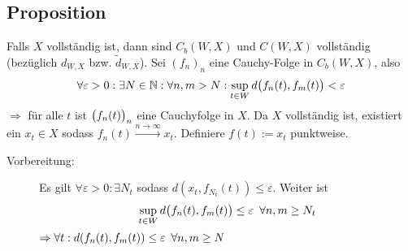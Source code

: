 \subsection[Proposition: $X$ vollständig $\Rightarrow$ $C-B(W,X)$ und $C8W,X$ vollständig]{Proposition} %
\label{sub:18}
Falls $X$ vollständig ist, dann sind $C_b(W,X)$ und $C(W,X)$ vollständig (bezüglich $d_{W,X}$ bzw. $\tilde{d}_{W,X}$).
Sei $(f_n)_n$ eine Cauchy-Folge in $C_b(W,X)$, also
\[
	\forall \varepsilon>0 : \exists N \in \mathds{N} : \forall n,m >N : \sup_{t \in W} d \enbrace[\big]{f_n(t), f_m(t)}< \varepsilon 
\]
$\Rightarrow$ für alle $t$ ist $\enbrace[\big]{f_n(t)}_n$ eine Cauchyfolge in $X$. Da $X$ vollständig ist, existiert ein $x_t \in X$ sodass 
$f_n(t) \xrightarrow{n \to \infty} x_t$. Definiere $f(t) := x_t$ punktweise.
\begin{description}
	\item[Vorbereitung:] Es gilt $\forall \varepsilon>0 : \exists N_t$ sodass $d(x_t, f_{N_t}(t)) \le \varepsilon$. Weiter ist
	\[
		\sup_{t \in W} d \enbrace[\big]{f_n(t), f_m(t)}\le \varepsilon \enspace \forall n,m \ge N_t
	\]
	$\Rightarrow \forall t : d \enbrace*{f_n(t), f_m(t)}\le \varepsilon \enspace \forall n,m \ge N$
\end{description}

